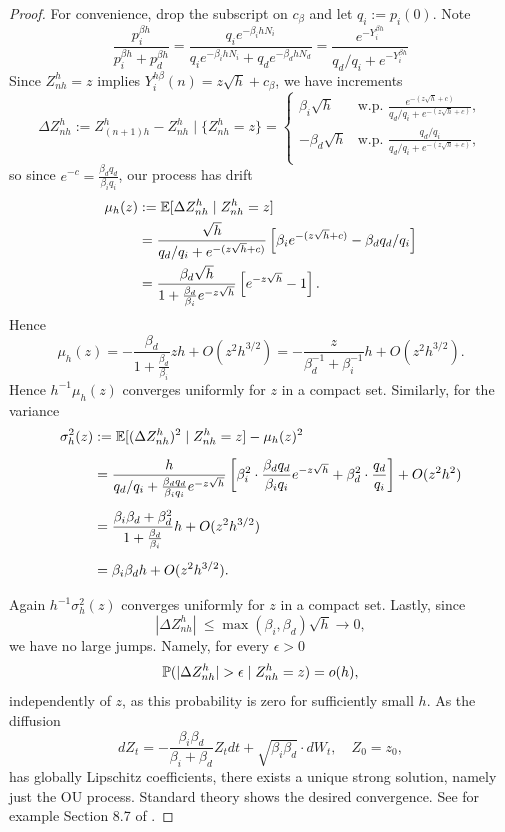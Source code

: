 \begin{subappendices}
\begin{proof}
For convenience, drop the subscript on $c_\beta$ and let $q_i := p_i(0)$. Note
%
\[\frac{p_i^{\beta h}}{p_i^{\beta h} + p_d^{\beta h}} = \frac{q_ie^{-\beta_i h N_i}}{q_ie^{-\beta_i h N_i} + q_de^{-\beta_d h N_d}} = \frac{e^{-Y_i^{\beta h}}}{q_d/q_i + e^{-Y_i^{\beta h}}}\]
%
\noindent Since $Z_{nh}^h = z$ implies $Y^{h\beta}_i(n) = z \sqrt{h} + c_\beta$, we have increments
%
\[\Delta Z_{nh}^h :=  Z_{(n+1)h}^h - Z_{nh}^h \mid \{Z_{nh}^h = z\} = \begin{cases}
    \beta_i\sqrt{h} & \text{w.p. } \frac{e^{-( z\sqrt{h} + c) }}{q_d/q_i + e^{-( z\sqrt{h} + c)}}, \\[5pt]
    -\beta_d\sqrt{h} & \text{w.p. } \frac{q_d/q_i}{q_d/q_i + e^{-( z\sqrt{h} + c)}}, \\
\end{cases}\]
%
\noindent so since $e^{-c} = \frac{\beta_dq_d}{\beta_iq_i}$, our process has drift
%
\begin{align*}
    \mu_h(z) & := \E [ \Delta Z_{nh}^h \mid Z_{nh}^h = z]\\
    & = \frac{\sqrt{h}}{q_d/q_i + e^{- (z \sqrt{h} + c)}}\left[\beta_i e^{- (z \sqrt{h} + c)} - \beta_d q_d/q_i\right] \\
    & = \frac{\beta_d\sqrt{h}}{1 + \frac{\beta_d}{\beta_i} e^{- z \sqrt{h}}} \left[e^{- z \sqrt{h}} - 1\right].
\end{align*}
%
\noindent Hence
%
\[\mu_h(z) = -\frac{\beta_d }{1 + \frac{\beta_d}{\beta_i}} zh + O(z^2h^{3/2}) = -\frac{z}{\beta_d^{-1} + \beta_i^{-1}} h + O(z^2h^{3/2}).\]
%
\noindent Hence $h^{-1} \mu_h(z)$ converges uniformly for $z$ in a compact set. Similarly, for the variance
%
\begin{align*}
    \sigma^2_h(z) & := \E [ (\Delta Z_{nh}^h)^2 \mid Z_{nh}^h = z] - \mu_h(z)^2 \\[5pt]
    & = \frac{h}{q_d/q_i + \frac{\beta_dq_d}{\beta_iq_i}e^{-z \sqrt{h}}} \left[\beta_i^2 \cdot \frac{\beta_dq_d}{\beta_iq_i} e^{- z \sqrt{h}} + \beta_d^2 \cdot \frac{q_d}{q_i}\right] + O(z^2h^2)\\[5pt]
    & = \frac{\beta_i\beta_d + \beta_d^2}{1 + \frac{\beta_d}{\beta_i}}h + O(z^2h^{3/2})\\[5pt]
    & = \beta_i \beta_d h +O(z^2h^{3/2}).
\end{align*}

\noindent Again $h^{-1} \sigma_h^2(z)$ converges uniformly for $z$ in a compact set. Lastly, since
%
    \[|\Delta Z_{nh}^h|~\leq \max(\beta_i, \beta_d) \sqrt{h} \to 0,\]
%
\noindent we have no large jumps. Namely, for every $\epsilon > 0$
%
    \[\P(|\Delta Z_{nh}^h| > \epsilon \mid Z_{nh}^h = z) = o(h), \]
%
independently of $z$, as this probability is zero for sufficiently small $h$. As the diffusion
%
\[dZ_t = -\frac{\beta_i \beta_d}{\beta_i + \beta_d} Z_t dt + \sqrt{\beta_i\beta_d} \cdot dW_t, \quad Z_0 = z_0,\]
%
has globally Lipschitz coefficients, there exists a unique strong solution, namely just the OU process. Standard theory shows the desired convergence. See for example Section 8.7 of \cite{durrett1996_stochastic_calculus_practical_introduction}.
\end{proof}


\end{subappendices}
